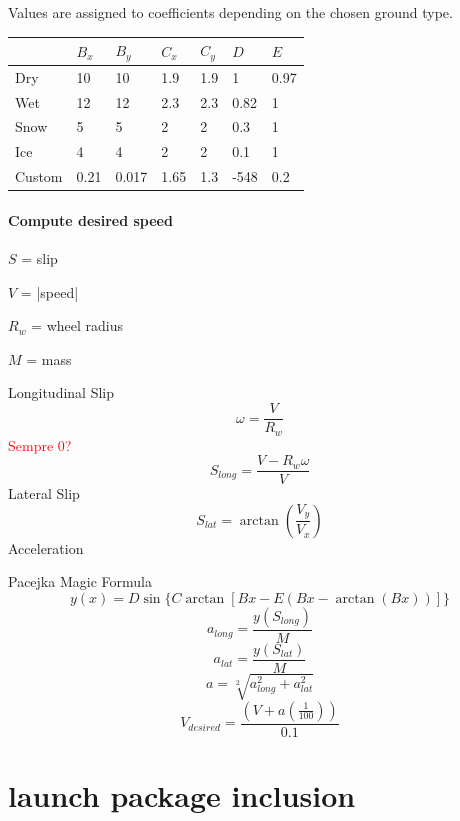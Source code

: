 \documentclass[12pt, letterpaper]{report}
\begin{document}
Values are assigned to coefficients depending on the chosen ground type.

\begin{center}
	\begin{tabularx}{\textwidth}{|X|X|X|X|X|X|X|}
		\hline
		 & $B_x$ & $B_y$ & $C_x$ & $C_y$ & $D$ & $E$ \\
		\hline
		Dry & 10 & 10 & 1.9 & 1.9 & 1 & 0.97 \\
		\hline
		Wet & 12 & 12 & 2.3 & 2.3 & 0.82 & 1 \\
		\hline
		Snow & 5 & 5 & 2 & 2 & 0.3 & 1 \\
		\hline
		Ice & 4 & 4 & 2 & 2 & 0.1 & 1 \\
		\hline
		Custom & 0.21 & 0.017 & 1.65 & 1.3 & -548 & 0.2 \\
		\hline
	\end{tabularx}
\end{center}

\subsubsection{Compute desired speed}

$S$ = slip

$V$ = |speed|

$R_w$ = wheel radius 

$M$ = mass

Longitudinal Slip
\[
\omega = \frac{V}{R_w}
\]
\textcolor{red}{Sempre 0?}
\[
S_{long} = \frac{V - R_w\omega}{V}
\]
Lateral Slip
\[
S_{lat} = \arctan\left(\frac{V_y}{V_x}\right)
\]
Acceleration

Pacejka Magic Formula
\[
y(x) = D\sin\{C\arctan[Bx - E(Bx - \arctan(Bx))]\}
\]
\[
a_{long} = \frac{y(S_{long})}{M}
\]
\[
a_{lat} = \frac{y(S_{lat})}{M}
\]
\[
a = \sqrt[2]{a_{long}^2 + a_{lat}^2}
\]
\[
V_{desired} = \frac{\left(V + a\left(\frac{1}{100}\right)\right)}{0.1}
\]

\appendix

\chapter{launch package inclusion}
\end{document}
